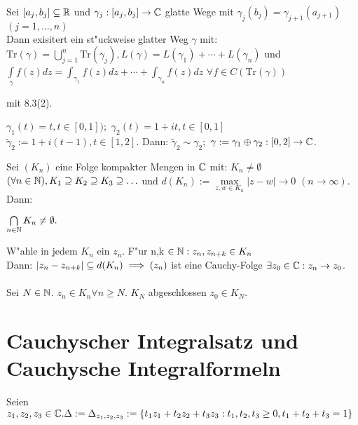 \documentclass[a4paper,twoside,DIV15,BCOR12mm]{scrbook}
\def\Tr{\text{Tr}}
\def\wegint{\ensuremath{\int\limits_\gamma}}
\def\iint{\ensuremath{\int\limits}}
\begin{document}
\begin{samepage}\begin{satz}
   Sei $[a_j,b_j]\subseteq \mathbb{R}$ und $\gamma_j:[a_j,b_j]\to\mathbb{C}$ glatte Wege mit $\gamma_j(b_j)=\gamma_{j+1}(a_{j+1}) $ $ (j=1,\ldots,n)$ \\
   Dann exisitert ein st"uckweise glatter Weg $\gamma$ mit: $\Tr(\gamma) = \bigcup\limits_{j=1}^n \Tr(\gamma_j),L(\gamma)=L(\gamma_1)+\cdots+L(\gamma_n)$ und $\wegint f(z)dz = \iint_{\gamma_1} f(z)dz+\cdots+\iint_{\gamma_n} f(z)dz $ $\forall f\in C(\Tr(\gamma))$
   
\end{satz}\end{samepage}

\begin{beweis}
mit 8.3(2).
\end{beweis}
\begin{beispiel}
$\gamma_1(t)=t, t\in[0,1]);$ $\gamma_2(t)=1+it, t\in[0,1]$\\
$\tilde\gamma_2:=1+i(t-1), t\in[1,2]$. Dann: $\tilde\gamma_2 \sim \gamma_2;$ $\gamma:=\gamma_1\oplus\gamma_2:[0,2]\to\mathbb{C}$.
\end{beispiel}
\begin{samepage}\begin{satz}
  Sei $(K_n)$ eine Folge kompakter Mengen in $\mathbb{C}$ mit: $K_n\neq\emptyset $ $ (\forall n\in\mathbb{N}), K_1\supseteq K_2\supseteq K_3\supseteq \ldots$ und $d(K_n):=\max\limits_{z,w\in K_n}|z-w| \to 0 $ $(n\to\infty)$. Dann: \\
  \centerline{ $\bigcap\limits_{n\in\mathbb{N}} K_n \neq \emptyset.$}
\end{satz}\end{samepage}
\begin{beweis}
W"ahle in jedem $K_n$ ein $z_n$. F"ur n,k $\in \mathbb{N}:z_n,z_{n+k}\in K_n$\\
Dann: $|z_n-z_{n+k}|\subseteq d(K_n) \implies (z_n)$ ist eine Cauchy-Folge \folgt $\exists z_0\in\mathbb{C}:z_n\to z_0$.\\ \\
Sei $N\in\mathbb{N}$. $z_n \in K_n \forall n\ge N$. $K_N$ abgeschlossen \folgt $z_0\in K_N$.
\end{beweis}

\chapter{Cauchyscher Integralsatz und Cauchysche Integralformeln} 
\begin{definition}
Seien $z_1,z_2,z_3 \in \mathbb{C}. \Delta := \Delta_{z_1,z_2,z_3} := \{t_1z_1+t_2z_2+t_3z_3: t_1,t_2,t_3 \geq 0, t_1+t_2+t_3 = 1 \}$
\end{definition}
\end{document}
